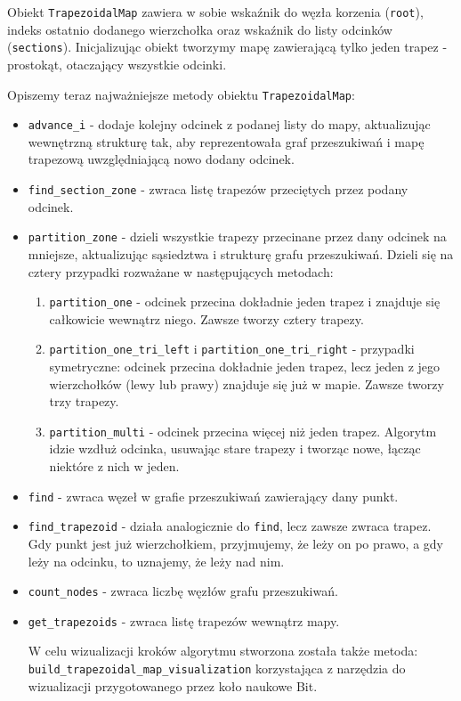 \documentclass[11pt,a4paper]{article}
\begin{document}
Obiekt \verb|TrapezoidalMap| zawiera w sobie wskaźnik do
węzła korzenia (\verb|root|), indeks ostatnio dodanego wierzchołka
oraz wskaźnik do listy odcinków (\verb|sections|). Inicjalizując
obiekt tworzymy mapę zawierającą tylko jeden trapez - prostokąt,
otaczający wszystkie odcinki.

Opiszemy teraz najważniejsze metody obiektu \verb|TrapezoidalMap|:
\begin{itemize}
    \item \verb|advance_i| - dodaje kolejny odcinek z podanej 
    listy do mapy, aktualizując wewnętrzną strukturę tak, aby
    reprezentowała graf przeszukiwań i mapę trapezową uwzględniającą
    nowo dodany odcinek.
    \item \verb|find_section_zone| - zwraca listę trapezów
    przeciętych przez podany odcinek.
    \item \verb|partition_zone| - dzieli wszystkie trapezy
    przecinane przez dany odcinek na mniejsze, aktualizując
    sąsiedztwa i strukturę grafu przeszukiwań. Dzieli się 
    na cztery przypadki rozważane w następujących metodach:
    \begin{enumerate}
        \item \verb|partition_one| - odcinek przecina dokładnie
        jeden trapez i znajduje się całkowicie wewnątrz niego.
        Zawsze tworzy cztery trapezy.
        \item \verb|partition_one_tri_left| i \verb|partition_one_tri_right| -
        przypadki symetryczne: odcinek przecina dokładnie jeden trapez,
        lecz jeden z jego wierzchołków (lewy lub prawy) znajduje się już
        w mapie. Zawsze tworzy trzy trapezy.
        \item \verb|partition_multi| - odcinek przecina więcej niż jeden
        trapez. Algorytm idzie wzdłuż odcinka, usuwając stare trapezy
        i tworząc nowe, łącząc niektóre z nich w jeden.
    \end{enumerate}
    \item \verb|find| - zwraca węzeł w grafie przeszukiwań
    zawierający dany punkt.
    \item \verb|find_trapezoid| - działa analogicznie do \verb|find|,
    lecz zawsze zwraca trapez. Gdy punkt jest już wierzchołkiem,
    przyjmujemy, że leży on po prawo, a gdy leży na odcinku, to uznajemy,
    że leży nad nim.
    \item \verb|count_nodes| - zwraca liczbę węzłów grafu przeszukiwań.
    \item \verb|get_trapezoids| - zwraca listę trapezów wewnątrz mapy.

W celu wizualizacji kroków algorytmu stworzona została także
metoda: \\ 
\verb|build_trapezoidal_map_visualization| korzystająca 
z narzędzia do wizualizacji przygotowanego przez koło naukowe Bit.
\end{itemize}
\end{document}
